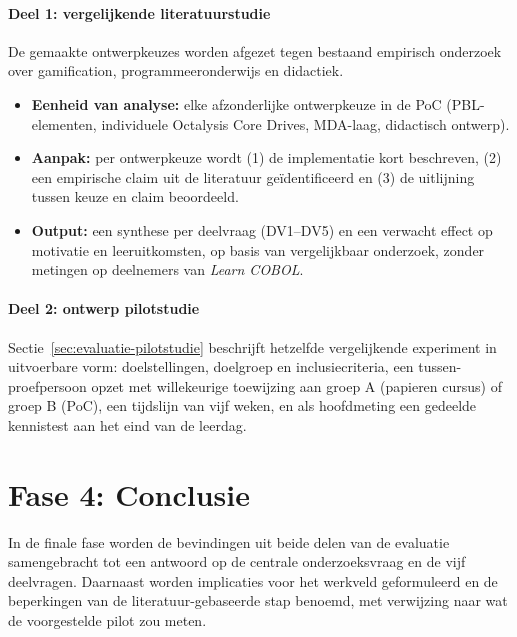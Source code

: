 \paragraph{Deel 1: vergelijkende literatuurstudie}
De gemaakte ontwerpkeuzes worden afgezet tegen bestaand empirisch onderzoek over gamification, programmeeronderwijs en didactiek.
\begin{itemize}
    \item \textbf{Eenheid van analyse:} elke afzonderlijke ontwerpkeuze in de PoC (PBL-elementen, individuele Octalysis Core Drives, MDA-laag, didactisch ontwerp).
    \item \textbf{Aanpak:} per ontwerpkeuze wordt (1) de implementatie kort beschreven, (2) een empirische claim uit de literatuur geïdentificeerd en (3) de uitlijning tussen keuze en claim beoordeeld.
    \item \textbf{Output:} een synthese per deelvraag (DV1--DV5) en een verwacht effect op motivatie en leeruitkomsten, op basis van vergelijkbaar onderzoek, zonder metingen op deelnemers van \textit{Learn COBOL}.
\end{itemize}

\paragraph{Deel 2: ontwerp pilotstudie}
Sectie~\ref{sec:evaluatie-pilotstudie} beschrijft hetzelfde vergelijkende experiment in uitvoerbare vorm: doelstellingen, doelgroep en inclusiecriteria, een tussen-proefpersoon opzet met willekeurige toewijzing aan groep A (papieren cursus) of groep B (PoC), een tijdslijn van vijf weken, en als hoofdmeting een gedeelde kennistest aan het eind van de leerdag.

\section{Fase 4: Conclusie}
In de finale fase worden de bevindingen uit beide delen van de evaluatie samengebracht tot een antwoord op de centrale onderzoeksvraag en de vijf deelvragen.
Daarnaast worden implicaties voor het werkveld geformuleerd en de beperkingen van de literatuur-gebaseerde stap benoemd, met verwijzing naar wat de voorgestelde pilot zou meten.
